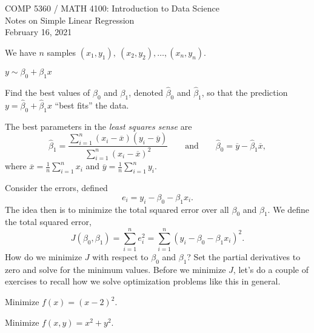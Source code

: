 \documentclass[letterpaper, 12pt]{amsart}
\begin{document}
\noindent COMP 5360 / MATH 4100:  Introduction to Data Science \\
Notes on Simple Linear Regression \\
February 16, 2021

\bigskip

 We have $n$ samples $(x_1, y_1), \ (x_2, y_2),\ldots,(x_n, y_n)$.

\bigskip

 $y \sim \beta_0 + \beta_1 x$ 

\bigskip

 Find the best values of $\beta_0$ and $\beta_1$, denoted $\hat{\beta}_0$ and $\hat{\beta}_1$, so that the prediction $y = \hat{\beta}_0 + \hat{\beta}_1 x$ ``best fits'' the data.

\bigskip

 The best parameters in the \emph{least squares sense} are
$$
\hat{\beta}_1 = \frac{ \sum_{i=1}^n (x_i - \overline{x})(y_i - \overline{y}) }{\sum_{i=1}^n (x_i - \overline{x})^2}
\qquad \textrm{and} \qquad
\hat{\beta}_0 = \overline{y} -  \hat{\beta}_1 \overline{x},  
$$
where $\overline{x} = \frac{1}{n} \sum_{i=1}^n x_i$ and $\overline{y} = \frac{1}{n} \sum_{i=1}^n y_i$. 

\bigskip

Consider the errors, defined
$$
e_i = y_i - \beta_0 - \beta_1 x_i .
$$
The idea then is to minimize the total squared error over all $\beta_0$ and $\beta_1$. We define the total squared error, 
$$
J(\beta_0, \beta_1) = \sum_{i=1}^n e_i^2  =   \sum_{i=1}^n (y_i - \beta_0 - \beta_1 x_i)^2. 
$$
How do we minimize $J$ with respect to $\beta_0$ and $\beta_1$? Set the partial derivatives to zero and solve for the minimum values. Before we minimize $J$, let's do a couple of exercises to recall how we solve optimization problems like this in general. 

\bigskip

 Minimize $f(x) = (x-2)^2$. 

\bigskip

 Minimize $f(x,y) = x^2 + y^2$. 

\bigskip
\end{document}
